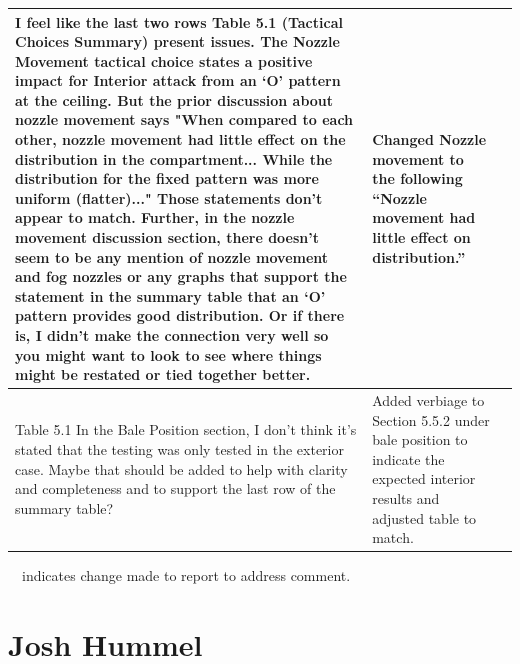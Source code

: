\documentclass[12pt,oneside]{book}
\begin{document}
\begin{landscape}
\begin{longtable}{|L{4in}|L{3.75in}|c|}
		\hline
		I feel like the last two rows Table 5.1 (Tactical Choices Summary) present issues. The Nozzle Movement tactical choice states a positive impact for Interior attack from an `O' pattern at the ceiling. But the prior discussion about nozzle movement says "When compared to each other, nozzle movement had little effect on the distribution in the compartment... While the distribution for the fixed pattern was more uniform (flatter)..." Those statements don't appear to match. Further, in the nozzle movement discussion section, there doesn't seem to be any mention of nozzle movement and fog nozzles or any graphs that support the statement in the summary table that an `O' pattern provides good distribution. Or if there is, I didn't make the connection very well so you might want to look to see where things might be restated or tied together better. &
		Changed Nozzle movement to the following ``Nozzle movement had little effect on distribution.'' & \checkmark \\

		\hline 
		Table 5.1 In the Bale Position section, I don't think it's stated that the testing was only tested in the exterior case. Maybe that should be added to help with clarity and completeness and to support the last row of the summary table? &
		Added verbiage to Section 5.5.2 under bale position to indicate the expected interior results and adjusted table to match. & \checkmark \\  

		\hline
\end{longtable}
\checkmark~~indicates change made to report to address comment.

\newpage

\section{Josh Hummel}
\begin{longtable}{|L{4in}|L{3.75in}|c|}


\end{longtable}
\end{landscape}
\end{document}
